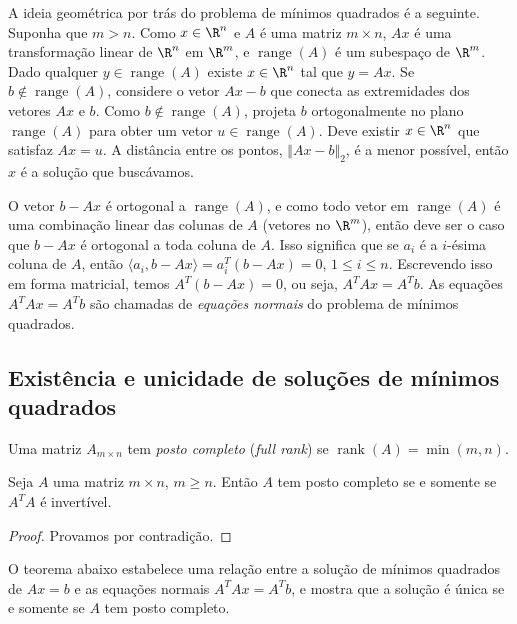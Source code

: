 \documentclass{article}
\DeclareMathOperator{\rank}{rank}
\DeclareMathOperator{\range}{range}
\begin{document}
A ideia geométrica por trás do problema de mínimos quadrados é a seguinte. Suponha que \(m > n\). Como \(x \in \R^n\) e \(A\) é uma matriz \(m \times n\), \(Ax\) é uma transformação linear de \(\R^n\) em \(\R^m\), e \(\range(A)\) é um subespaço de \(\R^m\). Dado qualquer \(y \in \range(A)\) existe \(x \in \R^n\) tal que \(y=Ax\). Se \(b \notin \range(A)\), considere o vetor \(Ax-b\) que conecta as extremidades dos vetores \(Ax\) e \(b\). Como \(b \notin \range(A)\), projeta \(b\) ortogonalmente no plano \(\range(A)\) para obter um vetor \(u \in \range(A)\). Deve existir \(x \in \R^n\) que satisfaz \(Ax=u\). A distância entre os pontos, \(\Vert Ax - b \Vert_2\), é a menor possível, então \(x\) é a solução que buscávamos.

O vetor \(b-Ax\) é ortogonal a \(\range(A)\), e como todo vetor em \(\range(A)\) é uma combinação linear das colunas de \(A\) (vetores no \(\R^m\)), então deve ser o caso que \(b-Ax\) é ortogonal a toda coluna de \(A\). Isso significa que se \(a_i\) é a \(i\)-ésima coluna de \(A\), então \(\langle a_i, b-Ax \rangle = a_i^T (b-Ax) = 0\), \(1 \leq i \leq n\). Escrevendo isso em forma matricial, temos \(A^T(b-Ax) = 0\), ou seja, \(A^TAx = A^Tb\). As equações \(A^TAx = A^Tb\) são chamadas de \emph{equações normais} do problema de mínimos quadrados.

\subsection{Existência e unicidade de soluções de mínimos quadrados}

\begin{defn}
    Uma matriz \(A_{m \times n}\) tem \emph{posto completo} (\emph{full rank}) se \(\rank(A) = \min(m,n)\). 
\end{defn}

\begin{lem}\label{lem:posto_completo}
    Seja \(A\) uma matriz \(m \times n\), \(m \geq n\). Então \(A\) tem posto completo se e somente se \(A^TA\) é invertível.
\end{lem}

\begin{proof}
    Provamos por contradição.
\end{proof}

O teorema abaixo estabelece uma relação entre a solução de mínimos quadrados de \(Ax=b\) e as equações normais \(A^TAx = A^Tb\), e mostra que a solução é única se e somente se \(A\) tem posto completo.
\end{document}
